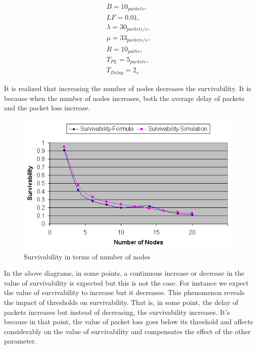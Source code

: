 \documentclass[onecolumn,conference]{IEEEtran}
\begin{document}
    \begin{equation}
        \begin{split}
            B=10_{packets},\\
            LF=0.01,\\
            \lambda=30_{packets/s},\\
            \mu=33_{packets/s},\\
            R=10_{paths},\\
            T_{PL}=5_{packets},\\
            T_{Delay}=2_s
        \end{split}
    \end{equation}

    It is realized that increasing the number of nodes decreases the survivability. It is because when the number of nodes increases, both the average delay of packets and the packet loss increase.

    \begin{figure}[htbp]
        \centerline{\includegraphics{rbpj5.png}}
        \caption{Survivability in terms of number of nodes}
        \label{fig:5}
    \end{figure}

    In the above diagrams, in some points, a continuous increase or decrease in the value of survivability is expected but this is not the case. For instance we expect the value of survivability to increase but it decreases. This phenomenon reveals the impact of thresholds on survivability. That is, in some point, the delay of packets increases but instead of decreasing, the survivability increases. It’s because in that point, the value of packet loss goes below its threshold and affects considerably on the value of survivability and compensates the effect of the other parameter.
\end{document}
